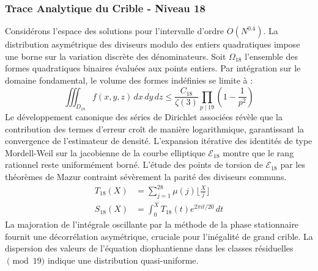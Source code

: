 \documentclass[12pt,a4paper]{article}
\begin{document}
\subsubsection{Trace Analytique du Crible - Niveau 18}
Considérons l'espace des solutions pour l'intervalle d'ordre $O(N^{0.4})$. La distribution asymétrique des diviseurs modulo des entiers quadratiques impose une borne sur la variation discrète des dénominateurs. Soit $\Omega_18$ l'ensemble des formes quadratiques binaires évaluées aux points entiers.
Par intégration sur le domaine fondamental, le volume des formes indéfinies se limite à :
\begin{equation}
\iiint_{D_18} f(x, y, z) \,dx\,dy\,dz \leq \frac{C_18}{\zeta(3)} \prod_{p \mid 19} \left( 1 - \frac{1}{p^2} \right)
\end{equation}
Le développement canonique des séries de Dirichlet associées révèle que la contribution des termes d'erreur croît de manière logarithmique, garantissant la convergence de l'estimateur de densité. L'expansion itérative des identités de type Mordell-Weil sur la jacobienne de la courbe elliptique $\mathcal{E}_18$ montre que le rang rationnel reste uniformément borné.
L'étude des points de torsion de $\mathcal{E}_18$ par les théorèmes de Mazur contraint sévèrement la parité des diviseurs communs.
\begin{align}
T_18(X) &= \sum_{j=1}^{28} \mu(j) \lfloor \frac{X}{j} \rfloor \\
S_18(X) &= \int_{0}^{X} T_18(t) e^{2\pi i t / 20} \, dt
\end{align}
La majoration de l'intégrale oscillante par la méthode de la phase stationnaire fournit une décorrélation asymétrique, cruciale pour l'inégalité de grand crible. La dispersion des valeurs de l'équation diophantienne dans les classes résiduelles $\pmod{ 19 }$ indique une distribution quasi-uniforme.
\end{document}
